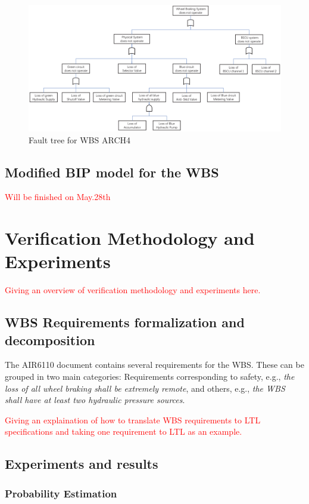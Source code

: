 \documentclass[conference]{IEEEtran}
\begin{document}
\begin{figure}[htbp]
	\centerline{\includegraphics[width=165mm]{figure/fault_tree.eps}}
	\caption{Fault tree for WBS ARCH4}
	\label{WBS_BIP_Nominal}
\end{figure}

\subsection{Modified BIP model for the WBS}
\textcolor{red}{
Will be finished on May.28th
}

\section{Verification Methodology and Experiments}
\textcolor{red}{
Giving an overview of verification methodology and experiments here.
}


\subsection{WBS Requirements formalization and decomposition}
The AIR6110 document contains several requirements for the WBS. These can be grouped in two main categories: Requirements corresponding to safety, e.g., \emph{the loss of all wheel braking shall be extremely remote}, and others, e.g., \emph{the WBS shall have at least two hydraulic pressure sources}.

\textcolor{red}{
Giving an explaination of how to translate WBS requirements to LTL specifications and taking one requirement to LTL as an example.
}

\subsection{Experiments and results}

\subsubsection{Probability Estimation}
\end{document}
